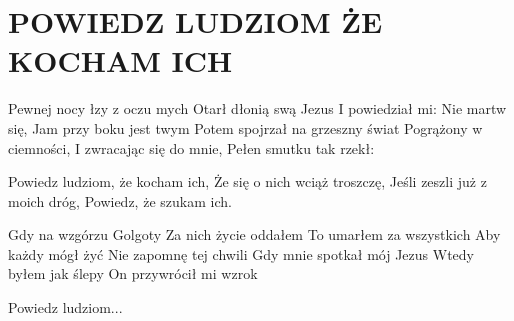 \documentclass[../../../songbook.tex]{subfiles}
\begin{document}
\TabPositions{8cm} %
\section*{POWIEDZ LUDZIOM ŻE KOCHAM ICH}
{}
\vspace{0.5cm}
Pewnej nocy łzy z oczu mych		 	 \newline
Otarł dłonią swą Jezus				 \newline
I powiedział mi: Nie martw się,		 \newline
Jam przy boku jest twym			 	 \newline
Potem spojrzał na grzeszny świat  \newline
Pogrążony w ciemności, \newline
I zwracając się do mnie, \newline
Pełen smutku tak rzekł: \newline

\-\hspace{1cm} Powiedz ludziom, że kocham ich,		 \newline
\-\hspace{1cm} Że się o nich wciąż troszczę,		 \newline
\-\hspace{1cm} Jeśli zeszli już z moich dróg,		 \newline
\-\hspace{1cm} Powiedz, że szukam ich. 			 	 \newline

Gdy na wzgórzu Golgoty \newline
Za nich życie oddałem \newline
To umarłem za wszystkich \newline
Aby każdy mógł żyć \newline
Nie zapomnę tej chwili \newline
Gdy mnie spotkał mój Jezus \newline
Wtedy byłem jak ślepy \newline
On przywrócił mi wzrok \newline

\-\hspace{1cm} Powiedz ludziom... \newline
\end{document}
